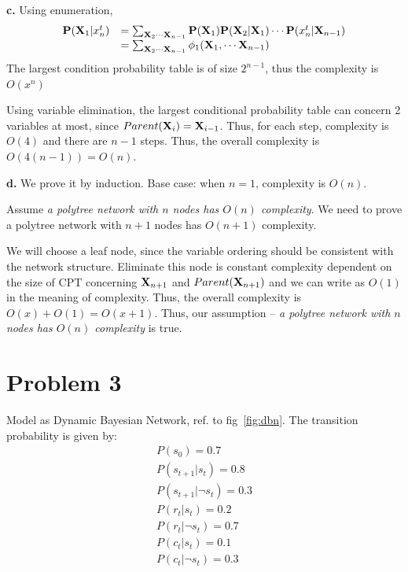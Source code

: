 \documentclass{mcmthesis}
\begin{document}
\noindent \textbf{c.} 
Using enumeration, \[\begin{array}{ll}
\mathbf{P}(\mathbf{X}_1|x_n^t)&=\sum_{\mathbf{X}_2 \cdots \mathbf{X}_{n-1} } \mathbf{P}(\mathbf{X}_1) \mathbf{P}(\mathbf{X}_2|\mathbf{X}_1) \cdots \mathbf{P}(x_n^t|\mathbf{X}_{n-1})  \\
& = \sum_{\mathbf{X}_2 \cdots \mathbf{X}_{n-1}} \phi_1(\mathbf{X}_1, \cdots \mathbf{X}_{n-1})
\end{array}\]
The largest condition probability table is of size $2^{n-1}$, thus the complexity is $O(x^n)$

Using variable elimination, the largest conditional probability table can concern 2 variables at most, since $Parent(\mathbf{X}_i)=\mathbf{X}_{i-1}$. Thus, for each step, complexity is $O(4)$ and there are $n-1$ steps. Thus, the overall complexity is $O(4(n-1))=O(n)$.

\noindent \textbf{d.}
We prove it by induction. Base  case: when $n =1 $, complexity is $O(n)$. 

Assume \textit{a polytree network with $n$ nodes has $O(n)$ complexity}. We need to prove a polytree network with $n+1$ nodes has $O(n+1)$ complexity. 

We will choose a {\color{red} leaf} node, since the variable ordering should be consistent with the network structure. Eliminate this node is constant complexity dependent on the size of CPT concerning $\mathbf{X}_{n+1}$ and $Parent(\mathbf{X}_{n+1})$ and we can write as $O(1)$ in the meaning of complexity. Thus, the overall complexity is $O(x)+O(1)=O(x+1)$. Thus, our assumption -- \textit{a polytree network with $n$ nodes has $O(n)$ complexity} is true.


\section{Problem 3}
Model as Dynamic Bayesian Network, ref. to fig~\vref{fig:dbn}.  The transition probability is given by:
\begin{align*}
P(s_0 ) = 0.7\\
P(s_{t+1} |s_t ) = 0.8\\
P(s_{t+1} |\neg s_t ) = 0.3\\
P(r_t |s_t ) = 0.2\\
P(r_t |\neg s_t ) = 0.7\\
P(c_t |s_t ) = 0.1 \\
P(c_t |\neg s_t ) = 0.3
\end{align*}
\end{document}

